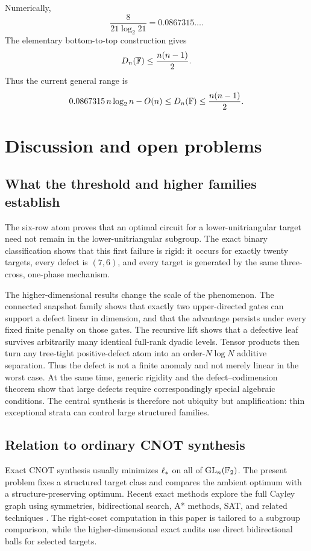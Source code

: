 Numerically,
\[
\frac{8}{21\log_2 21}
=0.0867315\ldots.
\]
The elementary bottom-to-top construction gives
\[
D_n(\mathbb F)\le\frac{n(n-1)}2.
\]
Thus the current general range is
\begin{equation}\label{eq:defect-range}
0.0867315\,n\log_2n-O(n)
\le
D_n(\mathbb F)
\le
\frac{n(n-1)}2.
\end{equation}

\section{Discussion and open problems}\label{sec:discussion}

\subsection{What the threshold and higher families establish}

The six-row atom proves that an optimal circuit for a lower-unitriangular target need not remain in the lower-unitriangular subgroup.  The exact binary classification shows that this first failure is rigid: it occurs for exactly twenty targets, every defect is $(7,6)$, and every target is generated by the same three-cross, one-phase mechanism.

The higher-dimensional results change the scale of the phenomenon.  The connected snapshot family shows that exactly two upper-directed gates can support a defect linear in dimension, and that the advantage persists under every fixed finite penalty on those gates.  The recursive lift shows that a defective leaf survives arbitrarily many identical full-rank dyadic levels.  Tensor products then turn any tree-tight positive-defect atom into an order-$N\log N$ additive separation.  Thus the defect is not a finite anomaly and not merely linear in the worst case.  At the same time, generic rigidity and the defect--codimension theorem show that large defects require correspondingly special algebraic conditions.  The central synthesis is therefore not ubiquity but amplification: thin exceptional strata can control large structured families.

\subsection{Relation to ordinary CNOT synthesis}

Exact CNOT synthesis usually minimizes $\ell_{*}$ on all of $\operatorname{GL}_n(\mathbb F_2)$.  The present problem fixes a structured target class and compares the ambient optimum with a structure-preserving optimum.  Recent exact methods explore the full Cayley graph using symmetries, bidirectional search, A* methods, SAT, and related techniques \cite{ChristensenEtAl2025,WebsterEtAl2025,ShaikVanDePol2025}.  The right-coset computation in this paper is tailored to a subgroup comparison, while the higher-dimensional exact audits use direct bidirectional balls for selected targets.

